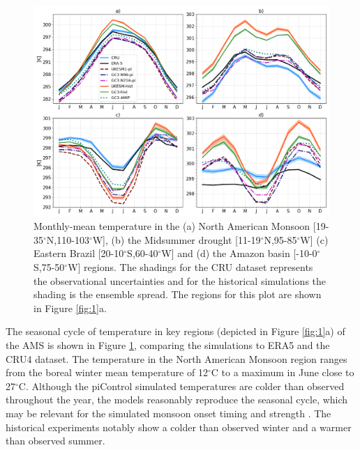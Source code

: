 
\begin{figure}[t!]
\centering
 \includegraphics[width=\linewidth]{figures/p2fig2_v3.png}
\caption{ Monthly-mean temperature in the (a) North American Monsoon [19-35$^\circ$N,110-103$^\circ$W], (b) the Midsummer drought [11-19$^\circ$N,95-85$^\circ$W] (c) Eastern Brazil [20-10$^\circ$S,60-40$^\circ$W] and (d) the Amazon basin [-10-0$^\circ$S,75-50$^\circ$W] regions. The shadings for the CRU dataset represents the observational uncertainties and for the historical simulations the shading is the ensemble spread. The regions for this plot are shown in Figure \ref{fig:1}a. }
\label{fig:2}
\end{figure}

The seasonal cycle of temperature in key regions (depicted in Figure \ref{fig:1}a) of the AMS is shown in Figure \ref{fig:2}, comparing the simulations to ERA5 and the CRU4 dataset.
The temperature in the North American Monsoon region ranges from the boreal winter mean temperature of 12$^\circ$C to a maximum in June close to 27$^\circ$C.
Although the piControl simulated temperatures are colder than observed throughout the year, the models reasonably reproduce the seasonal cycle, which may be relevant for the simulated monsoon onset timing and strength \citep{turrent2009}. The historical experiments notably show a colder than observed winter and a warmer than observed summer.


